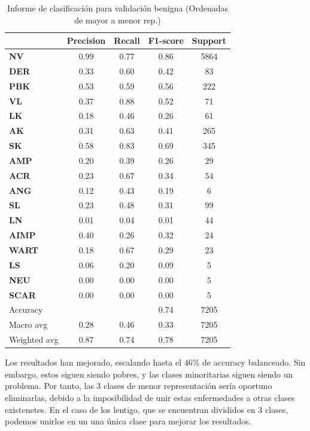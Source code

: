 \begin{table}[!ht]
	\centering
	\begin{tabular}{|l|c|c|c|c|}
		\hline
		& Precision & Recall & F1-score & Support \\
		\hline
	\textbf{NV} & 0.99 & 0.77 & 0.86 & 5864 \\ \hline
	\textbf{DER} & 0.33 & 0.60 & 0.42 & 83 \\ \hline
	\textbf{PBK} & 0.53 & 0.59 & 0.56 & 222 \\ \hline
	\textbf{VL} & 0.37 & 0.88 & 0.52 & 71 \\ \hline
	\textbf{LK} & 0.18 & 0.46 & 0.26 & 61 \\ \hline
	\textbf{AK} & 0.31 & 0.63 & 0.41 & 265 \\ \hline
	\textbf{SK} & 0.58 & 0.83 & 0.69 & 345 \\ \hline
	\textbf{AMP} & 0.20 & 0.39 & 0.26 & 29 \\ \hline
	\textbf{ACR} & 0.23 & 0.67 & 0.34 & 54 \\ \hline
	\textbf{ANG} & 0.12 & 0.43 & 0.19 & 6 \\ \hline
	\textbf{SL} & 0.23 & 0.48 & 0.31 & 99 \\ \hline
	\textbf{LN} & 0.01 & 0.04 & 0.01 & 44 \\ \hline
	\textbf{AIMP} & 0.40 & 0.26 & 0.32 & 24 \\ \hline
	\textbf{WART} & 0.18 & 0.67 & 0.29 & 23 \\ \hline
	\textbf{LS} & 0.06 & 0.20 & 0.09 & 5 \\ \hline
	\textbf{NEU} & 0.00 & 0.00 & 0.00 & 5 \\ \hline
	\textbf{SCAR} & 0.00 & 0.00 & 0.00 & 5 \\ \hline
		\hline
		Accuracy &  &  & 0.74 & 7205 \\
		Macro avg & 0.28& 0.46& 0.33&7205\\
		Weighted avg&0.87&0.74&0.78&7205\\
		\hline
	\end{tabular}
	\caption{Informe de clasificación para validación benigna (Ordenadas de mayor a menor rep.)}
	\label{tab:benignomalmejormetrics}
\end{table}

Los resultados han mejorado, escalando hasta el 46\% de accuracy balanceado. Sin embargo, estos siguen siendo pobres, y las clases minoritarias siguen siendo un problema. Por tanto, las 3 clases de menor representación sería oportuno eliminarlas, debido a la imposibilidad de unir estas enfermedades a otras clases existenetes. En el caso de los lentigo, que se encuentran divididos en 3 clases, podemos unirlos en un una única clase para mejorar los resultados.


